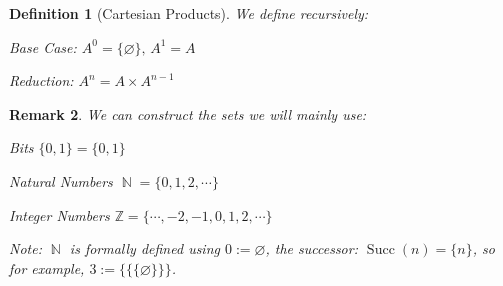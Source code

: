 \documentclass[12pt]{article}
\let\emptyset\varnothing
\let\RA\Rightarrow
\let\bar\overline
\DeclareMathOperator{\N}{\mathbb{N}}
\newcommand*{\B}{\{0,1\}}
\newtheorem{theorem}{Theorem}[subsection]
\newtheorem{definition}[theorem]{Definition}
\newtheorem{remark}[theorem]{Remark}
\begin{document}
\begin{definition}[Cartesian Products]
  We define recursively: 
  \begin{compactitem}
    \item[] Base Case: $A^0=\{\emptyset\},\,A^1=A$
    \item[] Reduction: $A^n=A\times A^{n-1}$
  \end{compactitem}
\end{definition}


\begin{remark}
  We can construct the sets we will mainly use:
  \begin{compactitem}
    \item [] Bits $\B=\{0,1\}$
    \item [] Natural Numbers $\N=\{0,1,2,\cdots\}$
    \item [] Integer Numbers $\mathbb{Z}=\{\cdots,-2,-1,0,1,2,\cdots\}$
  \end{compactitem}
  Note: $\N$ is formally defined using $0:=\emptyset$, the successor: $\operatorname{Succ}(n)=\{n\}$, so for example, $3:=\{\{\{\emptyset\}\}\}$.
\end{remark}
\end{document}
